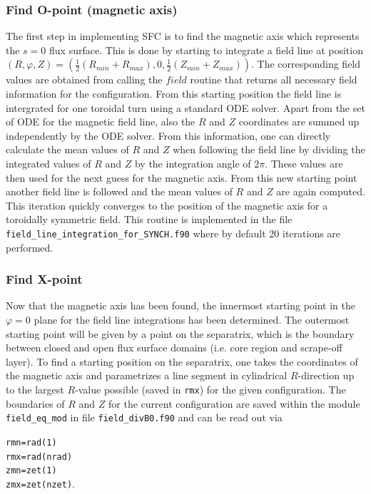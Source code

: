 \documentclass[./main.tex]{subfiles}
\begin{document}
\subsubsection{Find O-point (magnetic axis)}
The first step in implementing SFC is to find the magnetic axis which represents the $s=0$ flux surface. This is done by starting to integrate a field line  at position $(R,\varphi,Z) = (\frac{1}{2}(R_{min}+R_{max}),0,\frac{1}{2}(Z_{min}+Z_{max}))$. The corresponding field values are obtained from calling the $field$ routine that returns all necessary field information for the configuration. From this starting position the field line is intergrated for one toroidal turn using a standard ODE solver. Apart from the set of ODE for the magnetic field line, also the $R$ and $Z$ coordinates are summed up independently by the ODE solver. From this information, one can directly calculate the mean values of $R$ and $Z$ when following the field line by dividing the integrated values of $R$ and $Z$ by the integration angle of $2\pi$. These values are then used for the next guess for the magnetic axis. From this new starting point another field line is followed and the mean values of $R$ and $Z$ are again computed. This iteration quickly converges to the position of the magnetic axis for a toroidally symmetric field. This routine is implemented in the file \texttt{field\_line\_integration\_for\_SYNCH.f90} where by default 20 iterations are performed.
\subsubsection{Find X-point}
Now that the magnetic axis has been found, the innermost starting point in the $\varphi = 0 $ plane for the field line integrations has been determined. The outermost starting point will be given by a point on the separatrix, which is the boundary between closed and open flux surface domains (i.e. core region and scrape-off layer). To find a starting position on the separatrix, one takes the coordinates of the magnetic axis and parametrizes a line segment in cylindrical $R$-direction up to the largest $R$-value possible (saved in \texttt{rmx}) for the given configuration. The boundaries of $R$ and $Z$ for the current configuration are saved within the module \texttt{field\_eq\_mod} in file \texttt{field\_divB0.f90} and can be read out via

\texttt{rmn=rad(1)\\
rmx=rad(nrad)\\
zmn=zet(1)\\
zmx=zet(nzet)}.
\end{document}

